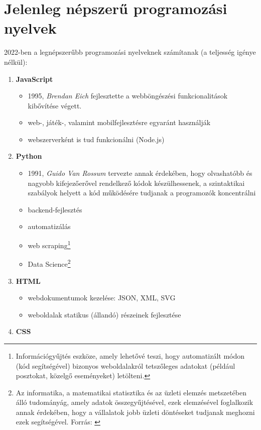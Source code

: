 \documentclass[tocnopagenum]{thesis-ekf}
\theoremstyle{definition}
\theoremstyle{remark}
\begin{document}
	\section{Jelenleg népszerű programozási nyelvek}
	2022-ben a legnépszerűbb programozási nyelveknek számítanak (a teljesség igénye nélkül):\cite{proglanguages1}\cite{proglanguages2}
	\begin{enumerate}
		\item \textbf{JavaScript}
		\begin{itemize}
			\item 1995, \textit{Brendan Eich} fejlesztette a webböngészési funkcionalitások kibővítése végett.
			\item web-, játék-, valamint mobilfejlesztésre egyaránt használják
			\item webszerverként is tud funkcionálni (Node.js)
		\end{itemize}
		\item \textbf{Python}
		\begin{itemize}
			\item 1991, \textit{Guido Van Rossum} tervezte annak érdekében, hogy olvashatóbb és nagyobb kifejezőerővel rendelkező kódok készülhessenek, a szintaktikai szabályok helyett a kód működésére tudjanak a programozók koncentrálni
			\item backend-fejlesztés
			\item automatizálás
			\item web scraping\footnote{Információgyűjtés eszköze, amely lehetővé teszi, hogy automatizált módon (kód segítségével) bizonyos weboldalakról tetszőleges adatokat (például posztokat, közelgő eseményeket) letölteni.}
			\item Data Science\footnote{Az informatika, a matematikai statisztika és az üzleti elemzés metszetében álló tudományág, amely adatok összegyűjtésével, ezek elemzésével foglalkozik annak érdekében, hogy a vállalatok jobb üzleti döntéseket tudjanak meghozni ezek segítségével. Forrás: \cite{q_datascience}}
		\end{itemize}
		\item \textbf{HTML}
		\begin{itemize}
			\item webdokumentumok kezelése: JSON, XML, SVG
			\item weboldalak statikus (állandó) részeinek fejlesztése
		\end{itemize}
		\item \textbf{CSS} 
		\begin{itemize}

\end{itemize}
\end{enumerate}
\end{document}
